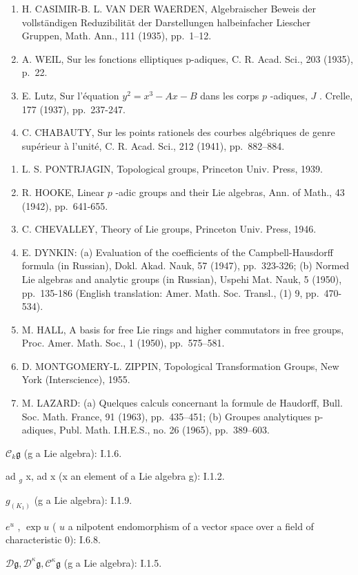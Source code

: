 \begin{enumerate}
\item
  H. CASIMIR-B. L. VAN DER WAERDEN, Algebraischer Beweis der vollständigen Reduzibilität der Darstellungen halbeinfacher Liescher Gruppen, Math. Ann., 111 (1935), pp.~1--12.
\item
  A. WEIL, Sur les fonctions elliptiques p-adiques, C. R. Acad. Sci., 203 (1935), p.~22.
\item
  E. Lutz, Sur l'équation \(y^{2} = x^{3} - Ax - B\) dans les corps \(p\) -adiques, \(J\) . Crelle, 177 (1937), pp.~237-247.
\item
  C. CHABAUTY, Sur les points rationels des courbes algébriques de genre supérieur à l'unité, C. R. Acad. Sci., 212 (1941), pp.~882--884.
\end{enumerate}

\begin{enumerate}
\def\labelenumi{\arabic{enumi}.}
\setcounter{enumi}{35}
\item
  L. S. PONTRJAGIN, Topological groups, Princeton Univ. Press, 1939.
\item
  R. HOOKE, Linear \(p\) -adic groups and their Lie algebras, Ann. of Math., 43 (1942), pp.~641-655.
\item
  C. CHEVALLEY, Theory of Lie groups, Princeton Univ. Press, 1946.
\item
  E. DYNKIN: (a) Evaluation of the coefficients of the Campbell-Hausdorff formula (in Russian), Dokl. Akad. Nauk, 57 (1947), pp.~323-326; (b) Normed Lie algebras and analytic groups (in Russian), Uspehi Mat. Nauk, 5 (1950), pp.~135-186 (English translation: Amer. Math. Soc. Transl., (1) 9, pp.~470-534).
\item
  M. HALL, A basis for free Lie rings and higher commutators in free groups, Proc. Amer. Math. Soc., 1 (1950), pp.~575--581.
\item
  D. MONTGOMERY-L. ZIPPIN, Topological Transformation Groups, New York (Interscience), 1955.
\item
  M. LAZARD: (a) Quelques calculs concernant la formule de Haudorff, Bull. Soc. Math. France, 91 (1963), pp.~435--451; (b) Groupes analytiques p-adiques, Publ. Math. I.H.E.S., no. 26 (1965), pp.~389--603.
\end{enumerate}

\(\mathcal{C}_k\mathfrak{g}\) (g a Lie algebra): I.1.6.

ad \(_{g}\) x, ad x (x an element of a Lie algebra g): I.1.2.

\(g_{(K_{1})}\) (g a Lie algebra): I.1.9.

\(e^u\) , \(\exp u\) ( \(u\) a nilpotent endomorphism of a vector space over a field of characteristic 0): I.6.8.

\(\mathcal{D}\mathfrak{g}, \mathcal{D}^{\kappa}\mathfrak{g}, \mathcal{C}^{\kappa}\mathfrak{g}\) (g a Lie algebra): I.1.5.
